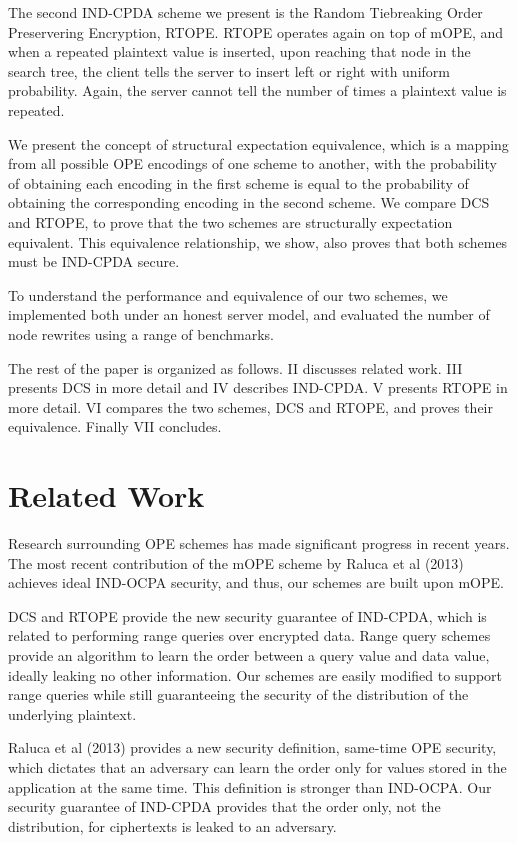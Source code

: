 \documentclass[12pt]{article}
\begin{document}
The second IND-CPDA scheme we present is the Random Tiebreaking Order Preservering Encryption, RTOPE. RTOPE operates again on top of mOPE, and when a repeated plaintext value is inserted, upon reaching that node in the search tree, the client tells the server to insert left or right with uniform probability. Again, the server cannot tell the number of times a plaintext value is repeated. 

We present the concept of structural expectation equivalence, which is a mapping from all possible OPE encodings of one scheme to another, with the probability of obtaining each encoding in the first scheme is equal to the probability of obtaining the corresponding encoding in the second scheme. We compare DCS and RTOPE, to prove that the two schemes are structurally expectation equivalent. This equivalence relationship, we show, also proves that both schemes must be IND-CPDA secure. 

To understand the performance and equivalence of our two schemes, we implemented both under an honest server model, and evaluated the number of node rewrites using a range of benchmarks.

The rest of the paper is organized as follows. II discusses related work. III presents DCS in more detail and IV describes IND-CPDA. V presents RTOPE in more detail. VI compares the two schemes, DCS and RTOPE, and proves their equivalence. Finally VII concludes.

\section{Related Work}

Research surrounding OPE schemes has made significant progress in recent years. The most recent contribution of the mOPE scheme by Raluca et al (2013) achieves ideal IND-OCPA security, and thus, our schemes are built upon mOPE.

DCS and RTOPE provide the new security guarantee of IND-CPDA, which is related to performing range queries over encrypted data. Range query schemes provide an algorithm to learn the order between a query value and data value, ideally leaking no other information. Our schemes are easily modified to support range queries while still guaranteeing the security of the distribution of the underlying plaintext.

Raluca et al (2013) provides a new security definition, same-time OPE security, which dictates that an adversary can learn the order only for values stored in the application at the same time. This definition is stronger than IND-OCPA. Our security guarantee of IND-CPDA provides that the order only, not the distribution, for ciphertexts is leaked to an adversary.
\end{document}
